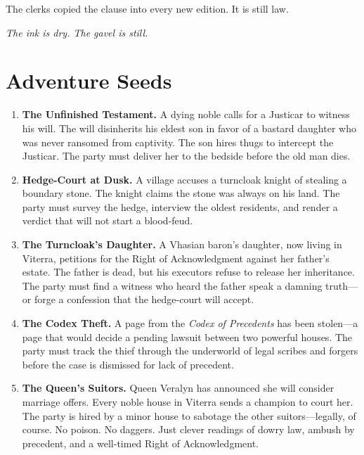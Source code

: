 \documentclass[11pt,twoside]{book}
\begin{document}
The clerks copied the clause into every new edition. It is still law.

\begin{center}
\textit{The ink is dry. The gavel is still.}
\end{center}

\chapter{Adventure Seeds}

\begin{enumerate}
    \item \textbf{The Unfinished Testament.} A dying noble calls for a Justicar to witness his will. The will disinherits his eldest son in favor of a bastard daughter who was never ransomed from captivity. The son hires thugs to intercept the Justicar. The party must deliver her to the bedside before the old man dies.
    
    \item \textbf{Hedge-Court at Dusk.} A village accuses a turncloak knight of stealing a boundary stone. The knight claims the stone was always on his land. The party must survey the hedge, interview the oldest residents, and render a verdict that will not start a blood-feud.
    
    \item \textbf{The Turncloak's Daughter.} A Vhasian baron's daughter, now living in Viterra, petitions for the Right of Acknowledgment against her father's estate. The father is dead, but his executors refuse to release her inheritance. The party must find a witness who heard the father speak a damning truth---or forge a confession that the hedge-court will accept.
    
    \item \textbf{The Codex Theft.} A page from the \textit{Codex of Precedents} has been stolen---a page that would decide a pending lawsuit between two powerful houses. The party must track the thief through the underworld of legal scribes and forgers before the case is dismissed for lack of precedent.
    
    \item \textbf{The Queen's Suitors.} Queen Veralyn has announced she will consider marriage offers. Every noble house in Viterra sends a champion to court her. The party is hired by a minor house to sabotage the other suitors---legally, of course. No poison. No daggers. Just clever readings of dowry law, ambush by precedent, and a well-timed Right of Acknowledgment.
\end{enumerate}
\end{document}
